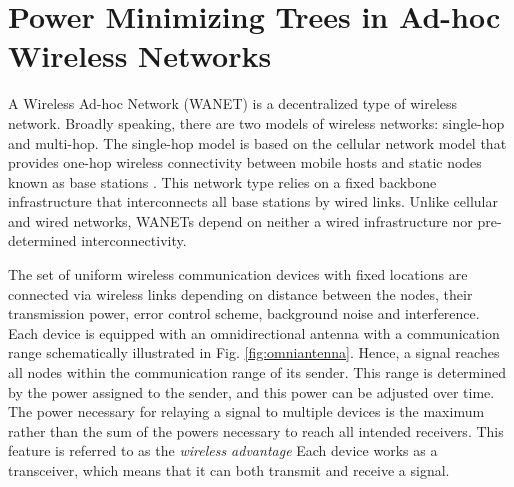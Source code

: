 \chapter{Power Minimizing Trees in Ad-hoc Wireless Networks}\label{sec:smt}

A Wireless Ad-hoc Network (WANET) is a decentralized type of wireless network.
Broadly speaking, there are two models of wireless networks: single-hop and multi-hop.
The single-hop model is based on the cellular network model that provides one-hop wireless connectivity between mobile hosts and static nodes known as base stations \cite{clementi01}.
This network type relies on a fixed backbone infrastructure that interconnects all base stations by wired links.
Unlike cellular and wired networks, WANETs depend on neither a wired infrastructure nor pre-determined interconnectivity.

The set of uniform wireless communication devices with fixed locations are connected via wireless links depending on 
distance between the nodes, their transmission power, error control scheme, background noise and interference.
Each device is equipped with an omnidirectional antenna with a communication range schematically illustrated in Fig. \ref{fig:omniantenna}.
Hence, a signal reaches all nodes within the communication range of its sender.
This range is determined by the power assigned to the sender, and this power can be adjusted over time.
The power necessary for relaying a signal to multiple devices is the maximum rather than the sum of the powers necessary to reach all intended receivers.
This feature is referred to as the \emph{wireless advantage} \cite{wieselthierXX}
Each device works as a transceiver, which means that it can both transmit and receive a signal.

